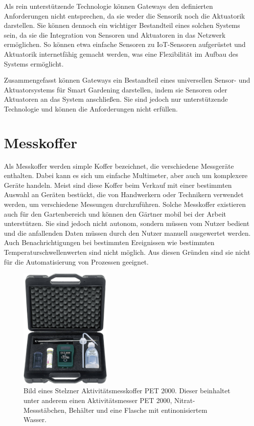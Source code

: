 Als rein unterstützende Technologie können Gateways den definierten Anforderungen nicht entsprechen, da sie weder die Sensorik noch die Aktuatorik darstellen.
Sie können dennoch ein wichtiger Bestandteil eines solchen Systems sein, da sie die Integration von Sensoren und Aktuatoren in das Netzwerk ermöglichen.
So können etwa einfache Sensoren zu IoT-Sensoren aufgerüstet und Aktuatorik internetfähig gemacht werden, was eine Flexibilität im Aufbau des Systems ermöglicht.

Zusammengefasst können Gateways ein Bestandteil eines universellen Sensor- und Aktuatorsystems für Smart Gardening darstellen, indem sie Sensoren oder Aktuatoren an das System anschließen.
Sie sind jedoch nur unterstützende Technologie und können die Anforderungen nicht erfüllen.



\section{Messkoffer}
Als Messkoffer werden simple Koffer bezeichnet, die verschiedene Messgeräte enthalten.
Dabei kann es sich um einfache Multimeter, aber auch um komplexere Geräte handeln.
Meist sind diese Koffer beim Verkauf mit einer bestimmten Auswahl an Geräten bestückt, die von Handwerkern oder Technikern verwendet werden, um verschiedene Messungen durchzuführen.
Solche Messkoffer existieren auch für den Gartenbereich und können den Gärtner mobil bei der Arbeit unterstützen.
Sie sind jedoch nicht autonom, sondern müssen vom Nutzer bedient und die anfallenden Daten müssen durch den Nutzer manuell ausgewertet werden.
Auch Benachrichtigungen bei bestimmten Ereignissen wie bestimmten Temperaturschwellenwerten sind nicht möglich.
Aus diesen Gründen sind sie nicht für die Automatisierung von Prozessen geeignet.

\begin{figure}[!htb]
	\centering
	\includegraphics[width=0.4\textwidth]{images/Messkoffer.jpg}
	\caption[Bild eines Stelzner Aktivitätsmesskoffer PET 2000.]{
		Bild eines Stelzner Aktivitätsmesskoffer PET 2000.
		Dieser beinhaltet unter anderem einen Aktivitätsmesser PET 2000, Nitrat-Messstäbchen, Behälter und eine Flasche mit entinonisiertem Wasser.\footnotemark}
	\label{pic:messkoffer}
\end{figure}

